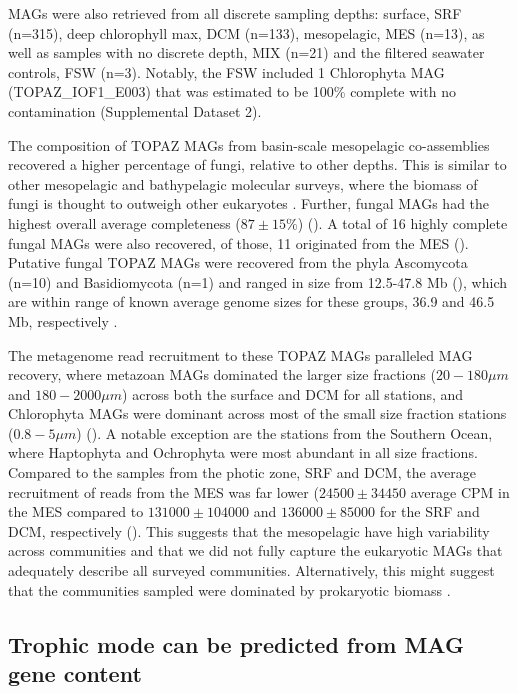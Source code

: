 \documentclass[12pt]{article}
\numberwithin{equation}{section}
\begin{document}
MAGs were also retrieved from all discrete sampling depths: surface, SRF (n=315), deep chlorophyll max, DCM (n=133), mesopelagic, MES (n=13), as well as samples with no discrete depth, MIX (n=21) and the filtered seawater controls, FSW (n=3). Notably, the FSW included 1 Chlorophyta MAG (TOPAZ\_IOF1\_E003) that was estimated to be 100\% complete with no contamination (Supplemental Dataset 2). 

The composition of TOPAZ MAGs from basin-scale mesopelagic co-assemblies recovered a higher percentage of fungi, relative to other depths. This is similar to other mesopelagic and bathypelagic molecular surveys, where the biomass of fungi is thought to outweigh other eukaryotes \citep{Morales_2019,Pernice_2015,Edgcomb_2010}. Further, fungal MAGs had the highest overall average completeness ($87 \pm 15\%$) (). A total of 16 highly complete fungal MAGs were also recovered, of those, 11 originated from the MES (). Putative fungal TOPAZ MAGs were recovered from the phyla Ascomycota (n=10) and Basidiomycota (n=1) and ranged in size from 12.5-47.8 Mb (), which are within range of known average genome sizes for these groups, 36.9 and 46.5 Mb, respectively \citep{Mohanta_2015}. 

The metagenome read recruitment to these TOPAZ MAGs paralleled MAG recovery, where metazoan MAGs dominated the larger size fractions ($20-180 \mu m$ and $180-2000 \mu m$) across both the surface and DCM for all stations, and Chlorophyta MAGs were dominant across most of the small size fraction stations ($0.8-5 \mu m$) (). A notable exception are the stations from the Southern Ocean, where Haptophyta and Ochrophyta were most abundant in all size fractions. Compared to the samples from the photic zone, SRF and DCM, the average recruitment of reads from the MES was far lower ($24500 \pm 34450$ average CPM in the MES compared to $131000 \pm 104000 $ and $136000 \pm 85000$ for the SRF and DCM, respectively (). This suggests that the mesopelagic have high variability across communities \citep{Pernice_2015} and that we did not fully capture the eukaryotic MAGs that adequately describe all surveyed communities. Alternatively, this might suggest that the communities sampled were dominated by prokaryotic biomass \citep{Pernice_2014}.  


\subsection*{Trophic mode can be predicted from MAG gene content}
\end{document}
